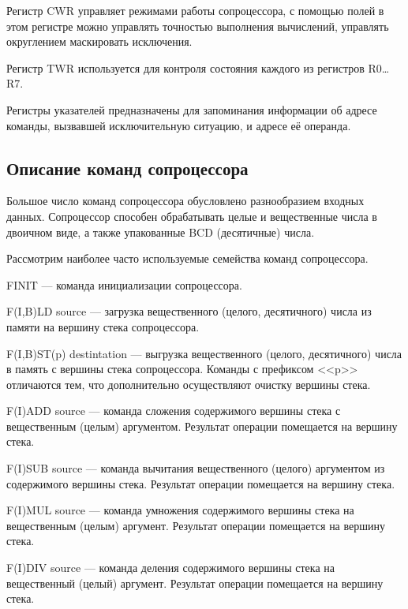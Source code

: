 Регистр CWR управляет режимами работы сопроцессора, с помощью полей в этом регистре
можно управлять точностью выполнения вычислений, управлять округлением маскировать исключения.

Регистр TWR используется для контроля состояния каждого из регистров R0\dots R7.

Регистры указателей предназначены для запоминания информации об адресе команды, вызвавшей 
исключительную ситуацию, и адресе её операнда.

\subsection{Описание команд сопроцессора}

Большое число команд сопроцессора обусловлено разнообразием входных данных.
Сопроцессор способен обрабатывать целые и вещественные числа в двоичном виде,
а также упакованные BCD (десятичные) числа.

Рассмотрим наиболее часто используемые семейства команд сопроцессора.

FINIT --- команда инициализации сопроцессора.

F(I,B)LD source --- загрузка вещественного (целого, десятичного) 
числа из памяти на вершину стека сопроцессора.

F(I,B)ST(p) destintation --- выгрузка вещественного (целого, десятичного) 
числа в память с вершины стека сопроцессора. Команды с префиксом <<p>>
отличаются тем, что дополнительно осуществляют очистку вершины стека.

F(I)ADD source --- команда сложения содержимого вершины стека с вещественным (целым)
аргументом. Результат операции помещается на вершину стека.

F(I)SUB source --- команда вычитания вещественного (целого)
аргументом из содержимого вершины стека. Результат операции помещается на вершину стека.

F(I)MUL source --- команда умножения содержимого вершины стека на вещественным (целым)
аргумент. Результат операции помещается на вершину стека.

F(I)DIV source --- команда деления содержимого вершины стека на вещественный (целый)
аргумент. Результат операции помещается на вершину стека.